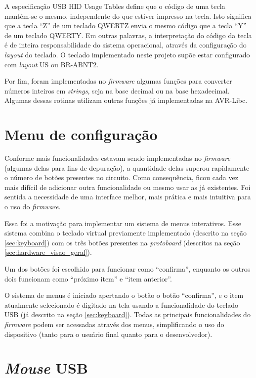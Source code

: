 \documentclass[brazil,pagestart=firstchapter]{abnt}
\begin{document}
A especificação \ac{USB} \ac{HID} Usage Tables define que o código de uma
tecla mantém-se o mesmo, independente do que estiver impresso na tecla. Isto
significa que a tecla ``Z'' de um teclado QWERTZ envia o mesmo código que a
tecla ``Y'' de um teclado QWERTY. \cite[p.~53]{usbhut} Em outras palavras, a
interpretação do código da tecla é de inteira responsabilidade do sistema
operacional, através da configuração do \textit{layout} do teclado.  O
teclado implementado neste projeto supõe estar configurado com
\textit{layout} US ou BR-ABNT2.

Por fim, foram implementadas no \textit{firmware} algumas funções para
converter números inteiros em \textit{strings}, seja na base decimal ou na
base hexadecimal. Algumas dessas rotinas utilizam outras funções já
implementadas na AVR-Libc.


\section{Menu de configuração}
\label{sec:menu}

Conforme mais funcionalidades estavam sendo implementadas no
\textit{firmware} (algumas delas para fins de depuração), a quantidade delas
superou rapidamente o número de botões presentes no circuito. Como
consequência, ficou cada vez mais difícil de adicionar outra funcionalidade
ou mesmo usar as já existentes. Foi sentida a necessidade de uma interface
melhor, mais prática e mais intuitiva para o uso do \textit{firmware}.

Essa foi a motivação para implementar um sistema de menus interativos. Esse
sistema combina o teclado virtual previamente implementado (descrito na
seção \ref{sec:keyboard}) com os três botões presentes na
\textit{protoboard} (descritos na seção \ref{sec:hardware_visao_geral}).

Um dos botões foi escolhido para funcionar como ``confirma'', enquanto os
outros dois funcionam como ``próximo item'' e ``item anterior''.

O sistema de menus é iniciado apertando o botão o botão ``confirma'', e o
item atualmente selecionado é digitado na tela usando a funcionalidade do
teclado \ac{USB} (já descrito na seção \ref{sec:keyboard}). Todas as
principais funcionalidades do \textit{firmware} podem ser acessadas através
dos menus, simplificando o uso do dispositivo (tanto para o usuário final
quanto para o desenvolvedor).


\section{\textit{Mouse} USB}
\label{sec:mouse}
\end{document}
